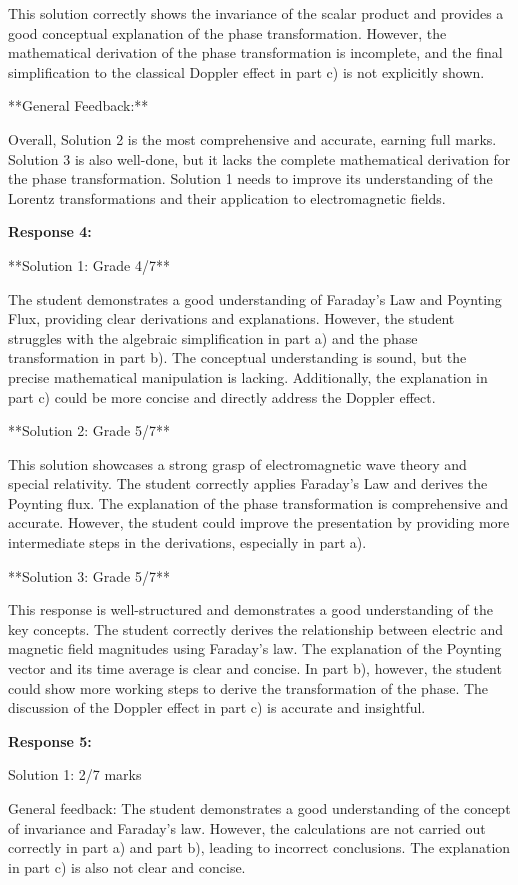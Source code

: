 \documentclass[a4paper,11pt]{article}
\begin{document}
This solution correctly shows the invariance of the scalar product and provides a good conceptual explanation of the phase transformation. However, the mathematical derivation of the phase transformation is incomplete, and the final simplification to the classical Doppler effect in part c) is not explicitly shown.

**General Feedback:**

Overall, Solution 2 is the most comprehensive and accurate, earning full marks. Solution 3 is also well-done, but it lacks the complete mathematical derivation for the phase transformation. Solution 1 needs to improve its understanding of the Lorentz transformations and their application to electromagnetic fields.

\textbf{Response 4:}

**Solution 1: Grade 4/7**

The student demonstrates a good understanding of Faraday's Law and Poynting Flux, providing clear derivations and explanations. However, the student struggles with the algebraic simplification in part a) and the phase transformation in part b). The conceptual understanding is sound, but the precise mathematical manipulation is lacking. Additionally, the explanation in part c) could be more concise and directly address the Doppler effect.

**Solution 2: Grade 5/7**

This solution showcases a strong grasp of electromagnetic wave theory and special relativity. The student correctly applies Faraday's Law and derives the Poynting flux. The explanation of the phase transformation is comprehensive and accurate. However, the student could improve the presentation by providing more intermediate steps in the derivations, especially in part a).

**Solution 3: Grade 5/7**

This response is well-structured and demonstrates a good understanding of the key concepts. The student correctly derives the relationship between electric and magnetic field magnitudes using Faraday's law. The explanation of the Poynting vector and its time average is clear and concise. In part b), however, the student could show more working steps to derive the transformation of the phase. The discussion of the Doppler effect in part c) is accurate and insightful.

\textbf{Response 5:}

Solution 1: 2/7 marks

General feedback: The student demonstrates a good understanding of the concept of invariance and Faraday's law. However, the calculations are not carried out correctly in part a) and part b), leading to incorrect conclusions. The explanation in part c) is also not clear and concise.
\end{document}
